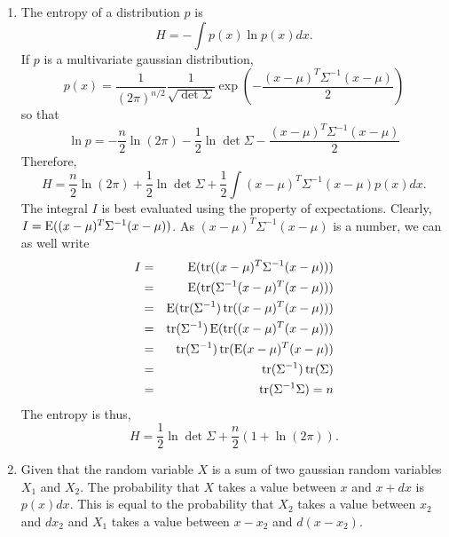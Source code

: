 \begin{enumerate}
\item The entropy of a distribution $p$ is
\[
H = -\int p(x)\ln p(x)dx.
\]
If $p$ is a multivariate gaussian distribution,
\[
p(x) = \frac{1}{(2\pi)^{n/2}}\frac{1}{\sqrt{\det\Sigma}}\exp\left(-\frac{(x - \mu)^T\Sigma^{-1}(x - \mu)}{2}\right)
\]
so that
\[
\ln p = -\frac{n}{2}\ln(2\pi) - \frac{1}{2}\ln\det\Sigma - \frac{(x - \mu)^T\Sigma^{-1}(x - \mu)}{2}
\]
Therefore,
\[
H = \frac{n}{2}\ln(2\pi) + \frac{1}{2}\ln\det\Sigma + \frac{1}{2}\int(x - \mu)^T\Sigma^{-1}(x - \mu)p(x)dx.
\]
The integral $I$ is best evaluated using the property of expectations. Clearly, $I = \operatorname{E}((x-\mu)^T\Sigma^{-1}(x-\mu))$.
As $(x-\mu)^T\Sigma^{-1}(x-\mu)$ is a number, we can as well write
\begin{eqnarray*}
I &=& \operatorname{E}(\operatorname{tr}((x - \mu)^T\Sigma^{-1}(x - \mu))) \\
  &=& \operatorname{E}(\operatorname{tr}(\Sigma^{-1}(x - \mu)^T(x - \mu))) \\
  &=& \operatorname{E}(\operatorname{tr}(\Sigma^{-1})\operatorname{tr}((x - \mu)^T(x - \mu))) \\
  &=& \operatorname{tr}(\Sigma^{-1})\operatorname{E}(\operatorname{tr}((x - \mu)^T(x - \mu))) \\
  &=& \operatorname{tr}(\Sigma^{-1})\operatorname{tr}(\operatorname{E}(x - \mu)^T(x - \mu)) \\
  &=& \operatorname{tr}(\Sigma^{-1})\operatorname{tr}(\Sigma) \\
  &=& \operatorname{tr}(\Sigma^{-1}\Sigma) = n
\end{eqnarray*}
The entropy is thus,
\[
H = \frac{1}{2}\ln\det\Sigma + \frac{n}{2}\left(1 + \ln(2\pi)\right).
\]

\item Given that the random variable $X$ is a sum of two gaussian random variables $X_1$ and $X_2$.
The probability that $X$ takes a value between $x$ and $x + dx$ is $p(x)dx$. This is equal to the
probability that $X_2$ takes a value between $x_2$ and $dx_2$ and $X_1$ takes a value between $x - x_2$
and $d(x - x_2)$.
\end{enumerate}

